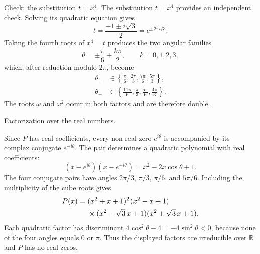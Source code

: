\documentclass[11pt,aspectratio=169]{beamer}
\newcommand{\slidebody}{%
  \fontsize{10.6}{12.8}\selectfont\justifying%
  \setlength{\parskip}{4.2pt}%
  \setlength{\abovedisplayskip}{4pt}%
  \setlength{\belowdisplayskip}{4pt}%
  \setlength{\abovedisplayshortskip}{2pt}%
  \setlength{\belowdisplayshortskip}{2.5pt}%
}
\newcommand{\tightbody}{\slidebody\fontsize{10.2}{12.3}\selectfont\setlength{\parskip}{3pt}}
\newcommand{\smallequation}{\fontsize{10.5}{13}\selectfont}
\begin{document}
\begin{frame}[t]{Check: the substitution $t=x^4$.}
\tightbody
\fontsize{9.9}{11.2}\selectfont\setlength{\parskip}{2pt}
The substitution $t=x^4$ provides an independent check. Solving its quadratic equation gives
\begin{equation}\label{eq:check-t}
  t=\frac{-1\pm i\sqrt{3}}{2}=e^{\pm2\pi i/3}.
\end{equation}
Taking the fourth roots of $x^4=t$ produces the two angular families
\begin{equation}\label{eq:check-general}
  \theta=\pm\frac{\pi}{6}+\frac{k\pi}{2},\qquad k=0,1,2,3,
\end{equation}
which, after reduction modulo $2\pi$, become
\begin{equation}\label{eq:check-angles}
\begin{aligned}
 \theta_+&\in\left\{\frac{\pi}{6},\frac{2\pi}{3},\frac{7\pi}{6},\frac{5\pi}{3}\right\},\\
 \theta_-&\in\left\{\frac{11\pi}{6},\frac{\pi}{3},\frac{5\pi}{6},\frac{4\pi}{3}\right\}.
\end{aligned}
\end{equation}
The roots $\omega$ and $\omega^2$ occur in both factors and are therefore double.
\end{frame}

\begin{frame}[t]{Factorization over the real numbers.}
\slidebody
Since $P$ has real coefficients, every non-real zero $e^{i\theta}$ is accompanied by its complex conjugate $e^{-i\theta}$. The pair determines a quadratic polynomial with real coefficients:
\begin{equation}\label{eq:real-quadratic}
 (x-e^{i\theta})(x-e^{-i\theta})=x^2-2x\cos\theta+1.
\end{equation}
The four conjugate pairs have angles $2\pi/3$, $\pi/3$, $\pi/6$, and $5\pi/6$. Including the multiplicity of the cube roots gives
\begin{equation}\label{eq:real-factor}
\smallequation
\begin{aligned}
P(x)={}&(x^2+x+1)^2(x^2-x+1)\\
&\times(x^2-\sqrt{3}\,x+1)(x^2+\sqrt{3}\,x+1).
\end{aligned}
\end{equation}
Each quadratic factor has discriminant $4\cos^2\theta-4=-4\sin^2\theta<0$, because none of the four angles equals $0$ or $\pi$. Thus the displayed factors are irreducible over $\mathbb R$ and $P$ has no real zeros.
\end{frame}
\end{document}
